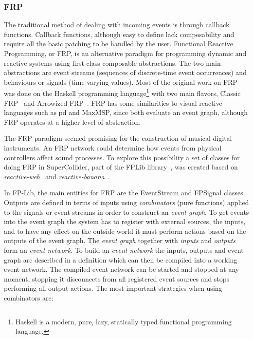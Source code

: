 \documentclass{article}
\begin{document}
\subsubsection{FRP}


The traditional method of dealing with incoming events is through callback functions. Callback functions, although easy to define lack composability and require all the basic patching to be handled by the user. Functional Reactive Programming, or FRP, is an alternative paradigm for programming dynamic and reactive systems using first-class composable abstractions. The two main abstractions are event streams (sequences of discrete-time event occurrences) and behaviours or signals (time-varying values). Most of the original work on FRP was done on the Haskell programming language\footnote{Haskell is a modern, pure, lazy, statically typed functional programming language.} with two main flavors, Classic FRP~\cite{elliott1997-fun,elliott2009-pus} and Arrowized FRP~\cite{hudak2003-arr,courtney2003yampa}. FRP has some similarities to visual reactive languages such as pd and MaxMSP, since both evaluate an event graph, although FRP operates at a higher level of abstraction.

The FRP paradigm seemed promising for the construction of musical digital instruments. An FRP network could determine how events from physical controllers affect sound processes. To explore this possibility a set of classes for doing FRP in SuperCollider, part of the FPLib library~\cite{-fpl}, was created based on \emph{reactive-web}~\cite{-reactive-web} and \emph{reactive-banana}~\cite{-reactive-banana}.
 
In FP-Lib, the main entities for FRP are the EventStream and FPSignal classes.  Outputs are defined in terms of inputs using \emph{combinators} (pure functions) applied to the signals or event streams in order to construct an \emph{event graph}. To get events into the event graph the system has to register with external sources, the inputs, and to have any effect on the outside world it must perform actions based on the outputs of the event graph. The \emph{event graph} together with \emph{inputs} and \emph{outputs} form an \emph{event network}. To build an \emph{event network} the inputs, outputs and event graph are described in a definition which can then be compiled into a working event network. The compiled event network can be started and stopped at any moment, stopping it disconnects from all registered event sources and stops performing all output actions. The most important strategies when using combinators are:
\end{document}
